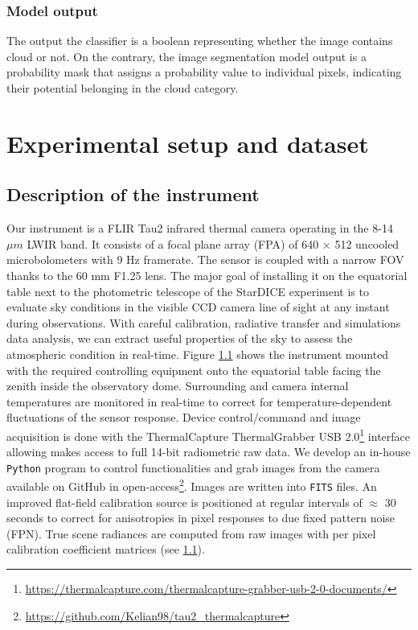 \documentclass[remotesensing,article,submit,pdftex,moreauthors]{Definitions/mdpi}
\begin{document}
\subsubsection{Model output}

The output the classifier is a boolean representing whether the image contains cloud or not. On the contrary, the image segmentation model output is a probability mask that assigns a probability value to individual pixels, indicating their potential belonging in the cloud category.

\section{Experimental setup and dataset}

\subsection{Description of the instrument}

Our instrument is a FLIR Tau2 infrared thermal camera operating in the 8-14 $\mu m$ LWIR band. It consists of a focal plane array (FPA) of 640 $\times$ 512 uncooled microbolometers with 9 Hz framerate. The sensor is coupled with a narrow FOV thanks to the 60 mm F1.25 lens. The major goal of installing it on the equatorial table next to the photometric telescope of the StarDICE experiment is to evaluate sky conditions in the visible CCD camera line of sight at any instant during observations. With careful calibration, radiative transfer and simulations data analysis, we can extract useful properties of the sky to assess the atmospheric condition in real-time. Figure \ref{} shows the instrument mounted with the required controlling equipment onto the equatorial table facing the zenith inside the observatory dome. Surrounding and camera internal temperatures are monitored in real-time to correct for temperature-dependent fluctuations of the sensor response. Device control/command and image acquisition is done with the ThermalCapture ThermalGrabber USB 2.0\footnote{\url{https://thermalcapture.com/thermalcapture-grabber-usb-2-0-documents/}} interface allowing makes access to full 14-bit radiometric raw data. We develop an in-house \texttt{Python} program to control functionalities and grab images from the camera available on GitHub in open-access\footnote{\url{https://github.com/Kelian98/tau2_thermalcapture}}. Images are written into \texttt{FITS} files. An improved flat-field calibration source is positioned at regular intervals of $\approx$ 30 seconds to correct for anisotropies in pixel responses to due fixed pattern noise (FPN). True scene radiances are computed from raw images with per pixel calibration coefficient matrices (see \ref{}).
\end{document}
